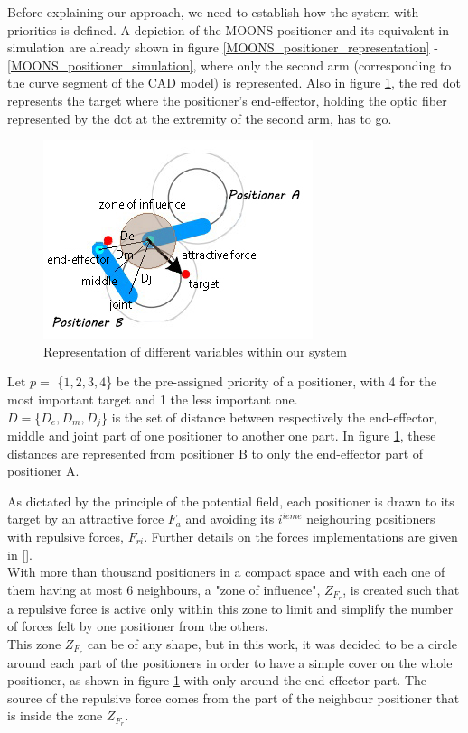 \documentclass[]{spie}  %
\begin{document}
	Before explaining our approach, we need to establish how the system with priorities is defined. 
	 A depiction of the MOONS positioner and its equivalent in simulation are already shown in figure \ref{MOONS_positioner_representation} - \ref{MOONS_positioner_simulation}, where only the second arm (corresponding to the curve segment of the CAD model) is represented. Also in figure \ref{sys_representation}, the red dot represents the target where the positioner's end-effector, holding the optic fiber represented by the dot at the extremity of the second arm, has to go.
		\begin{figure}[H]
			\centering
			\includegraphics[scale=0.56]{images/system_representation.jpg}
			\caption{Representation of different variables within our system}
			\label{sys_representation}
		\end{figure}
	
	Let $p =$ \{$1,2,3,4$\} be the pre-assigned priority of a positioner, with 4 for the most important target and 1 the less important one. \\
	$D=$\{$D_e, D_m, D_j$\} is the set of distance between respectively the end-effector, middle and joint part of one positioner to another one part. In figure \ref{sys_representation}, these distances are represented from positioner B to only the end-effector part of positioner A.

	As dictated by the principle of the potential field, each positioner is drawn to its target by an attractive force $F_a$ and avoiding its $i^{ieme}$ neighouring positioners with repulsive forces, $F_{ri}$. Further details on the forces implementations are given in []. \\
	 With more than thousand positioners in a compact space and with each one of them having at most 6 neighbours, a "zone of influence", $Z_{F_{r}}$, is created  such that a repulsive force is active only within this zone to limit and simplify the number of forces felt by one positioner from the others.\\ 
	 This zone $Z_{F_{r}}$ can be of any shape, but in this work,  it was decided to be a circle around each part of the positioners in order to have a simple cover on the whole positioner, as shown in figure \ref{sys_representation} with only around the end-effector part. The source of the repulsive force comes from the part of the neighbour positioner that is inside the zone $Z_{F_{r}}$.\\
	 
\end{document}
